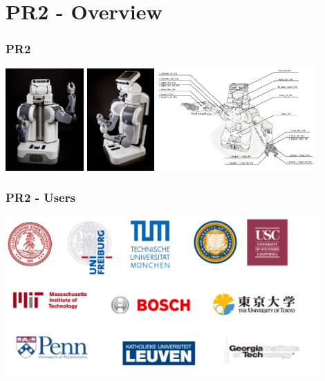 \section{PR2 - Overview}
\begin{frame}
  \frametitle{PR2}
\hspace{-3ex}\includegraphics[width=3cm]{img/PR2_front.jpeg} 
\includegraphics[width=2.57cm]{img/PR2_side.jpeg} 
\includegraphics[width=6cm]{img/pr2_link_name.png}
\end{frame}

\begin{frame}
  \frametitle{PR2 - Users}
\centering\includegraphics[width=12cm]{img/pr2_users.pdf} 
\end{frame}

